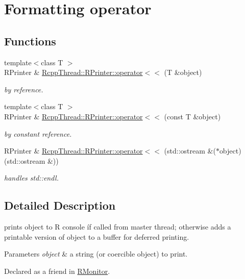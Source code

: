 \hypertarget{group__formatting}{}\section{Formatting operator}
\label{group__formatting}
\subsection*{Functions}
\begin{DoxyCompactItemize}
\item 
{\footnotesize template$<$class T $>$ }\\R\+Printer \& \hyperlink{group__formatting_gaeea190c50570dc8f857c8f58716f8418}{Rcpp\+Thread\+::\+R\+Printer\+::operator$<$$<$} (T \&object)\hypertarget{group__formatting_gaeea190c50570dc8f857c8f58716f8418}{}\label{group__formatting_gaeea190c50570dc8f857c8f58716f8418}

\begin{DoxyCompactList}\small\item\em by reference. \end{DoxyCompactList}\item 
{\footnotesize template$<$class T $>$ }\\R\+Printer \& \hyperlink{group__formatting_ga14488ec1ba0121b3e34cc2291edeaef7}{Rcpp\+Thread\+::\+R\+Printer\+::operator$<$$<$} (const T \&object)\hypertarget{group__formatting_ga14488ec1ba0121b3e34cc2291edeaef7}{}\label{group__formatting_ga14488ec1ba0121b3e34cc2291edeaef7}

\begin{DoxyCompactList}\small\item\em by constant reference. \end{DoxyCompactList}\item 
R\+Printer \& \hyperlink{group__formatting_ga1f4bfba8cc5853c021816ffce7714601}{Rcpp\+Thread\+::\+R\+Printer\+::operator$<$$<$} (std\+::ostream \&($\ast$object)(std\+::ostream \&))\hypertarget{group__formatting_ga1f4bfba8cc5853c021816ffce7714601}{}\label{group__formatting_ga1f4bfba8cc5853c021816ffce7714601}

\begin{DoxyCompactList}\small\item\em handles std\+::endl. \end{DoxyCompactList}\end{DoxyCompactItemize}


\subsection{Detailed Description}
prints {\ttfamily object} to R console íf called from master thread; otherwise adds a printable version of {\ttfamily object} to a buffer for deferred printing. 
\begin{DoxyParams}{Parameters}
{\em object} & a string (or coercible object) to print.\\
\hline
\end{DoxyParams}
Declared as a friend in {\ttfamily \hyperlink{class_rcpp_thread_1_1_r_monitor}{R\+Monitor}}. 